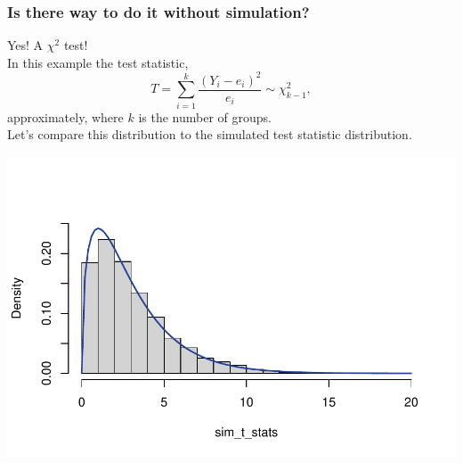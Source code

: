 \documentclass[a4paper]{article}\usepackage[]{graphicx}\usepackage[]{xcolor}
\makeatletter
\def\maxwidth{ %
  \ifdim\Gin@nat@width>\linewidth
    \linewidth
  \else
    \Gin@nat@width
  \fi
}
\makeatother
\begin{document}
\subsubsection{Is there way to do it without simulation?}
Yes! A \( \chi^2 \) test!\\
In this example the test statistic,
\[
	T = \sum_{i=1}^{k} \frac{(Y_i - e_i)^2}{e_i} \sim \chi^2_{k-1},
\]
approximately, where \( k \) is the number of groups.\\
Let's compare this distribution to the simulated test statistic distribution.
\begin{Schunk}


{\centering \includegraphics[width=\maxwidth]{figure/listings-unnamed-chunk-23-1} 

}

\end{Schunk}
\end{document}
